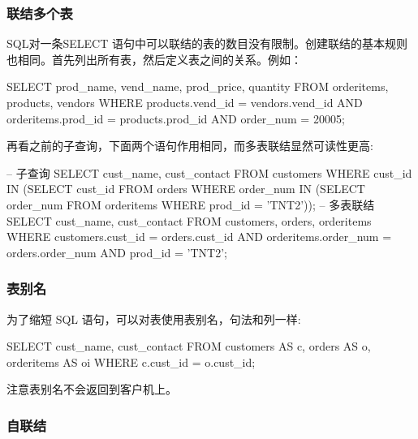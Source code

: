 \subsubsection{联结多个表}

SQL对一条SELECT 语句中可以联结的表的数目没有限制。创建联结的基本规则也相同。首先列出所有表，然后定义表之间的关系。例如：

\begin{sql}
SELECT prod_name, vend_name, prod_price, quantity
    FROM orderitems, products, vendors
    WHERE products.vend_id = vendors.vend_id
        AND orderitems.prod_id = products.prod_id
        AND order_num = 20005;
\end{sql}


再看之前的子查询，下面两个语句作用相同，而多表联结显然可读性更高:

\begin{sql}
-- 子查询
SELECT cust_name, cust_contact
FROM customers
WHERE cust_id IN (SELECT cust_id
                  FROM orders
                  WHERE order_num IN (SELECT order_num
                                      FROM orderitems
                                      WHERE prod_id = 'TNT2'));
-- 多表联结
SELECT cust_name, cust_contact
FROM customers, orders, orderitems
WHERE customers.cust_id = orders.cust_id
    AND orderitems.order_num = orders.order_num
    AND prod_id = 'TNT2';
\end{sql}

\subsubsection*{表别名}

为了缩短 SQL 语句，可以对表使用表别名，句法和列一样:
\begin{sql}
SELECT cust_name, cust_contact
    FROM customers AS c, orders AS o, orderitems AS oi
    WHERE c.cust_id = o.cust_id;
\end{sql}

注意表别名不会返回到客户机上。

\subsubsection{自联结}

